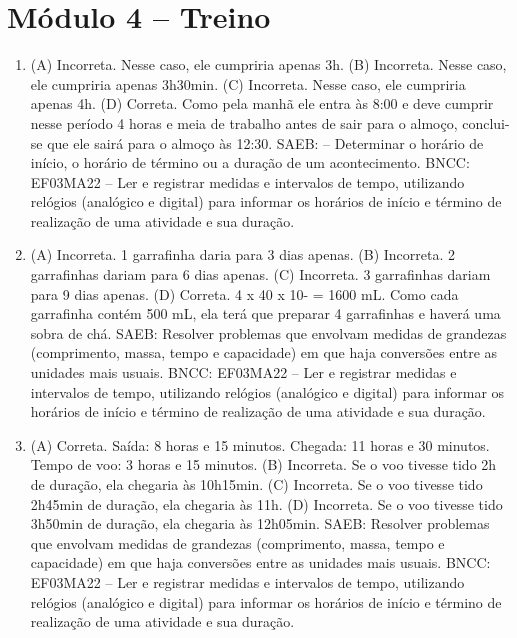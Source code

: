\section*{Módulo 4 -- Treino}

\begin{enumerate}
\item
(A) Incorreta. Nesse caso, ele cumpriria apenas 3h.
(B) Incorreta. Nesse caso, ele cumpriria apenas 3h30min.
(C) Incorreta. Nesse caso, ele cumpriria apenas 4h.
(D) Correta. Como pela manhã ele entra às 8:00 e deve cumprir nesse período 4 horas e
meia de trabalho antes de sair para o almoço, conclui-se que ele sairá para o almoço às 12:30.
SAEB: -- Determinar o horário de início, o horário de término ou a duração de um acontecimento. 
BNCC: EF03MA22 -- Ler e registrar medidas e intervalos de tempo, utilizando relógios (analógico e
digital) para informar os horários de início e término de realização de uma atividade e sua
duração.

\item
(A) Incorreta. 1 garrafinha daria para 3 dias apenas.
(B) Incorreta. 2 garrafinhas dariam para 6 dias apenas.
(C) Incorreta. 3 garrafinhas dariam para 9 dias apenas.
(D) Correta. 4 x 40 x 10- = 1600 mL. Como cada garrafinha contém 500 mL, ela terá que
preparar 4 garrafinhas e haverá uma sobra de chá.
SAEB: Resolver problemas que envolvam medidas de grandezas (comprimento, massa, tempo e capacidade) em que haja conversões entre as unidades mais usuais. 
BNCC: EF03MA22 -- Ler e registrar medidas e intervalos de tempo, utilizando relógios (analógico e
digital) para informar os horários de início e término de realização de uma atividade e sua
duração.

\item
(A) Correta. Saída: 8 horas e 15 minutos. Chegada: 11 horas e 30 minutos. Tempo de voo: 3 horas e 15 minutos.
(B) Incorreta. Se o voo tivesse tido 2h de duração, ela chegaria às 10h15min.
(C) Incorreta. Se o voo tivesse tido 2h45min de duração, ela chegaria às 11h.
(D) Incorreta. Se o voo tivesse tido 3h50min de duração, ela chegaria às 12h05min.
SAEB: Resolver problemas que envolvam medidas de grandezas (comprimento, massa, tempo e capacidade) em que haja conversões entre as unidades mais usuais. 
BNCC: EF03MA22 -- Ler e registrar medidas e intervalos de tempo, utilizando relógios (analógico e
digital) para informar os horários de início e término de realização de uma atividade e sua
duração.
\end{enumerate}

